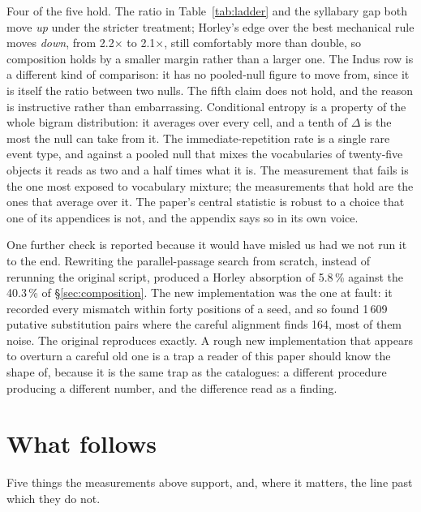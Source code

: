 \documentclass[11pt,a4paper]{article}
\begin{document}
Four of the five hold. The ratio in Table~\ref{tab:ladder} and the syllabary gap both move \emph{up} under the stricter treatment; Horley's edge over the best mechanical rule moves \emph{down}, from 2.2$\times$ to 2.1$\times$, still comfortably more than double, so composition holds by a smaller margin rather than a larger one. The Indus row is a different kind of comparison: it has no pooled-null figure to move from, since it is itself the ratio between two nulls. The fifth claim does not hold, and the reason is instructive rather than embarrassing. Conditional entropy is a property of the whole bigram distribution: it averages over every cell, and a tenth of $\Delta$ is the most the null can take from it. The immediate-repetition rate is a single rare event type, and against a pooled null that mixes the vocabularies of twenty-five objects it reads as two and a half times what it is. The measurement that fails is the one most exposed to vocabulary mixture; the measurements that hold are the ones that average over it. The paper's central statistic is robust to a choice that one of its appendices is not, and the appendix says so in its own voice.

One further check is reported because it would have misled us had we not run it to the end. Rewriting the parallel-passage search from scratch, instead of rerunning the original script, produced a Horley absorption of 5.8\,\% against the 40.3\,\% of \S\ref{sec:composition}. The new implementation was the one at fault: it recorded every mismatch within forty positions of a seed, and so found 1\,609 putative substitution pairs where the careful alignment finds 164, most of them noise. The original reproduces exactly. A rough new implementation that appears to overturn a careful old one is a trap a reader of this paper should know the shape of, because it is the same trap as the catalogues: a different procedure producing a different number, and the difference read as a finding.

\section{What follows}
\label{sec:follows}

Five things the measurements above support, and, where it matters, the line past which they do not.
\end{document}
